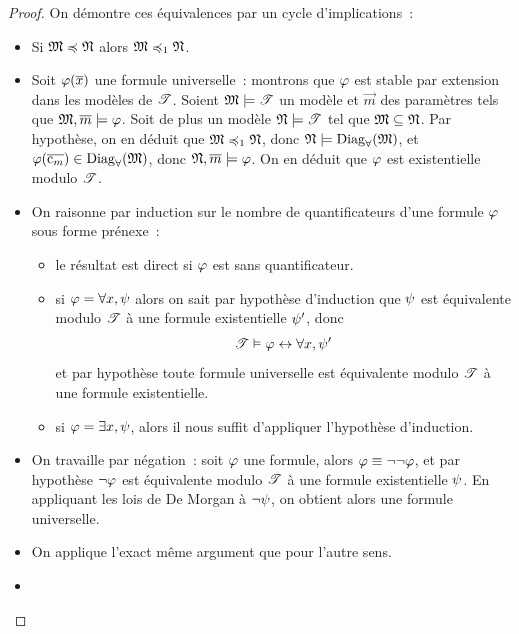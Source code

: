 \begin{proof}
  On démontre ces équivalences par un cycle d'implications~:
  \begin{itemize}
  \item \fbox{\ref{item.modcpl1}$\Rightarrow$\ref{item.modcpl2}}
    Si $\mathfrak{M}\preccurlyeq\mathfrak{N}$ alors $\mathfrak{M}\preccurlyeq_{1}\mathfrak{N}$.
  \item \fbox{\ref{item.modcpl2}$\Rightarrow$\ref{item.modcpl3}}
    Soit $\varphi(\overline{x})$ une formule universelle~: montrons que $\varphi$ est
    stable par extension dans les modèles de $\mathscr T$.
    Soient $\mathfrak{M}\models\mathscr T$ un modèle et $\vec m$ des paramètres tels que
    $\mathfrak{M},\overline{m}\models\varphi$. Soit de plus un modèle $\mathfrak{N}\models\mathscr T$
    tel que $\mathfrak{M}\subseteq\mathfrak{N}$. Par hypothèse, on en déduit que
    $\mathfrak{M}\preccurlyeq_{1}\mathfrak{N}$, donc $\mathfrak{N}\models\operatorname{Diag}_{\forall}(\mathfrak{M})$,
    et $\varphi(\overline{\mathrm{c}_m})\in\operatorname{Diag}_{\forall}(\mathfrak{M})$, donc
    $\mathfrak{N},\overline{m}\models\varphi$. On en déduit que $\varphi$ est existentielle
    modulo $\mathscr T$.
  \item \fbox{\ref{item.modcpl3}$\Rightarrow$\ref{item.modcpl4}}
    On raisonne par induction sur le nombre de quantificateurs d'une formule
    $\varphi$ sous forme prénexe~:
    \begin{itemize}
    \item le résultat est direct si $\varphi$ est sans quantificateur.
    \item si $\varphi = \forall x, \psi$ alors on sait par hypothèse
      d'induction que $\psi$ est équivalente modulo $\mathscr T$ à une formule
      existentielle $\psi'$, donc
      \[\mathscr T\vDash\varphi \mathrel{\leftrightarrow} \forall x, \psi'\]
      et par hypothèse toute formule universelle est équivalente modulo $\mathscr T$
      à une formule existentielle.
    \item si $\varphi = \exists x, \psi$, alors il nous suffit d'appliquer
      l'hypothèse d'induction.
    \end{itemize}
  \item \fbox{\ref{item.modcpl4}$\Rightarrow$\ref{item.modcpl5}}
    On travaille par négation~: soit $\varphi$ une formule, alors
    $\varphi \equiv\lnot\lnot\varphi$, et par hypothèse $\lnot\varphi$ est
    équivalente modulo $\mathscr T$ à une formule existentielle $\psi$. En
    appliquant les lois de De Morgan à $\lnot\psi$, on obtient alors une
    formule universelle.
  \item \fbox{\ref{item.modcpl5}$\Rightarrow$\ref{item.modcpl4}}
    On applique l'exact même argument que pour l'autre sens.
  \item \fbox{
}
\end{itemize}
\end{proof}
